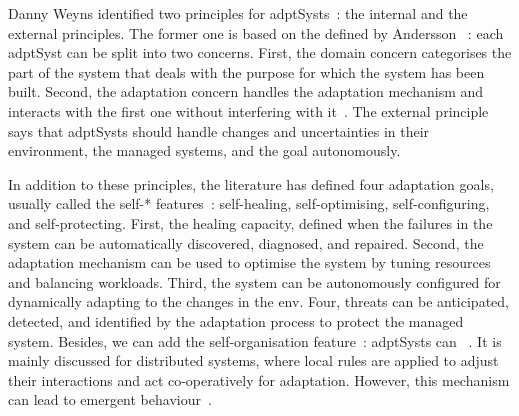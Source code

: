 Danny Weyns	identified two principles for \glspl{adptSyst}~\cite{DBLP:books/sp/19/Weyns19}: the internal and the external principles.
The former one is based on the  defined by Andersson \etal ~\cite{DBLP:conf/icse/AnderssonLMW09}: each \gls{adptSyst} can be split into two concerns.
First, the domain concern categorises the part of the system that deals with the purpose for which the system has been built.
Second, the adaptation concern handles the adaptation mechanism and interacts with the first one without interfering with it~\cite{DBLP:journals/tse/KramerM90}.
The external principle says that \glspl{adptSyst} should handle changes and uncertainties in their environment, the managed systems, and the goal autonomously.

In addition to these principles, the literature has defined four adaptation goals, usually called the self-* features~\cite{computing2006architectural}: self-healing, self-optimising, self-configuring, and self-protecting.
First, the healing capacity, defined when the failures in the system can be automatically discovered, diagnosed, and repaired.
Second, the adaptation mechanism can be used to optimise the system by tuning resources and balancing workloads.
Third, the system can be autonomously configured for dynamically adapting to the changes in the \gls{env}.
Four, threats can be anticipated, detected, and identified by the adaptation process to protect the managed system.
Besides, we can add the self-organisation feature~\cite{dempster1998self}: \glspl{adptSyst} can ~\cite{DBLP:conf/atal/WolfH04}.
It is mainly discussed for distributed systems, where local rules are applied to adjust their interactions and act co-operatively for adaptation.
However, this mechanism can lead to emergent behaviour~\cite{DBLP:conf/atal/WolfH04}.

